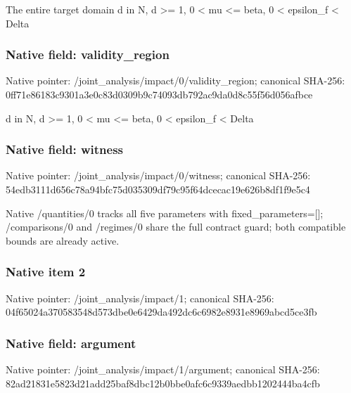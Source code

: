 \documentclass[10pt,a4paper]{article}
\begin{document}
\begingroup\raggedright\sloppy The entire target domain d in N,\allowbreak{} d >=\allowbreak{} 1,\allowbreak{} 0 < mu <=\allowbreak{} beta,\allowbreak{} 0 < epsilon\_\allowbreak{}f < Delta\par\endgroup

\subsubsection{Native field: validity\_\allowbreak{}region}
Native pointer: /joint\_\allowbreak{}analysis/impact/0/validity\_\allowbreak{}region; canonical SHA-256: 0ff71e86183c9301a3e0c83d0309b9c74093db792ac9da0d8c55f56d056afbce

\begingroup\raggedright\sloppy d in N,\allowbreak{} d >=\allowbreak{} 1,\allowbreak{} 0 < mu <=\allowbreak{} beta,\allowbreak{} 0 < epsilon\_\allowbreak{}f < Delta\par\endgroup

\subsubsection{Native field: witness}
Native pointer: /joint\_\allowbreak{}analysis/impact/0/witness; canonical SHA-256: 54edb3111d656c78a94bfc75d035309df79c95f64dcecac19e626b8df1f9e5c4

\begingroup\raggedright\sloppy Native /\allowbreak{}quantities/\allowbreak{}0 tracks all five parameters with fixed\_\allowbreak{}parameters=\allowbreak{}[];\allowbreak{} /\allowbreak{}comparisons/\allowbreak{}0 and /\allowbreak{}regimes/\allowbreak{}0 share the full contract guard;\allowbreak{} both compatible bounds are already active.\par\endgroup

\subsubsection{Native item 2}
Native pointer: /joint\_\allowbreak{}analysis/impact/1; canonical SHA-256: 04f65024a370583548d573dbe0e6429da492dc6c6982e8931e8969abcd5ce3fb

\subsubsection{Native field: argument}
Native pointer: /joint\_\allowbreak{}analysis/impact/1/argument; canonical SHA-256: 82ad21831e5823d21add25baf8dbc12b0bbe0afc6c9339aedbb1202444ba4cfb
\end{document}
